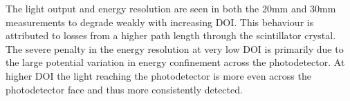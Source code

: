 The light output and energy resolution are seen in both the 20mm and 30mm measurements to degrade weakly with increasing DOI. This behaviour is attributed to losses from a higher path length through the scintillator crystal. The severe penalty in the energy resolution at very low DOI is primarily due to the large potential variation in energy confinement across the photodetector. At higher DOI the light reaching the photodetector is more even across the photodetector face and thus more consistently detected.
